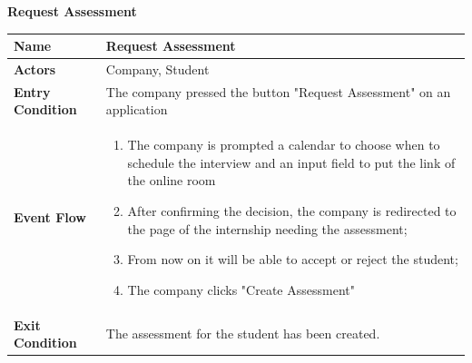 \begin{enumerate}[label=\textbf{[US\arabic*]}, left = 0pt, align = left, resume]
            \newpage
            \item \textbf{Request Assessment}
            
            \begin{longtable}{|l|p{11cm}|}  
                \hline
                \textbf{Name} & 
                    \textbf{Request Assessment} \\
                \hline
                
                \textbf{Actors} & 
                    Company, Student\\
                \hline
                
                \textbf{Entry Condition} & 
                    The company pressed the button "Request Assessment" on an application \\
                \hline
                
                \textbf{Event Flow} &
                    \begin{enumerate}[label=\arabic*., itemsep=0.2em]
                        \item The company is prompted a calendar to choose when to schedule the interview and an input field to put the link of the online room
                        \item After confirming the decision, the company is redirected to the page of the internship needing the assessment;
                        \item From now on it will be able to accept or reject the student;
                        \item The company clicks "Create Assessment" 
                    \end{enumerate} \\
                \hline
                
                \textbf{Exit Condition} & 
                    The assessment for the student has been created. \\
                \hline
                

\end{longtable}
\end{enumerate}
